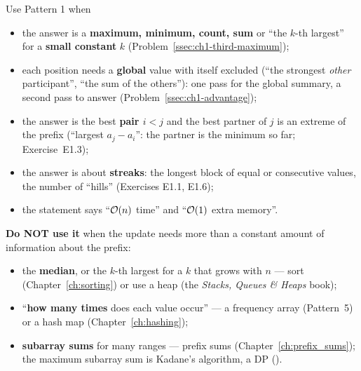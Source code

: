 Use Pattern 1 when
\begin{itemize}[leftmargin=*]
    \item the answer is a \textbf{maximum, minimum, count, sum} or ``the $k$-th largest'' for a \textbf{small constant} $k$ (Problem~\ref{ssec:ch1-third-maximum});
    \item each position needs a \textbf{global} value with itself excluded (``the strongest \emph{other} participant'', ``the sum of the others''): one pass for the global summary, a second pass to answer (Problem~\ref{ssec:ch1-advantage});
    \item the answer is the best \textbf{pair $i < j$} and the best partner of $j$ is an extreme of the prefix (``largest $a_j - a_i$'': the partner is the minimum so far; Exercise~E1.3);
    \item the answer is about \textbf{streaks}: the longest block of equal or consecutive values, the number of ``hills'' (Exercises E1.1, E1.6);
    \item the statement says ``$\mathcal{O}(n)$ time'' and ``$\mathcal{O}(1)$ extra memory''.
\end{itemize}

\textbf{Do NOT use it} when the update needs more than a constant amount of information about the prefix:
\begin{itemize}[leftmargin=*]
    \item the \textbf{median}, or the $k$-th largest for a $k$ that grows with $n$ --- sort (Chapter~\ref{ch:sorting}) or use a heap (the \textit{Stacks, Queues \& Heaps} book);
    \item ``\textbf{how many times} does each value occur'' --- a frequency array (Pattern~5) or a hash map (Chapter~\ref{ch:hashing});
    \item \textbf{subarray sums} for many ranges --- prefix sums (Chapter~\ref{ch:prefix_sums}); the maximum subarray sum is Kadane's algorithm, a DP ().
\end{itemize}

\begin{diagrambox}
\end{diagrambox}

